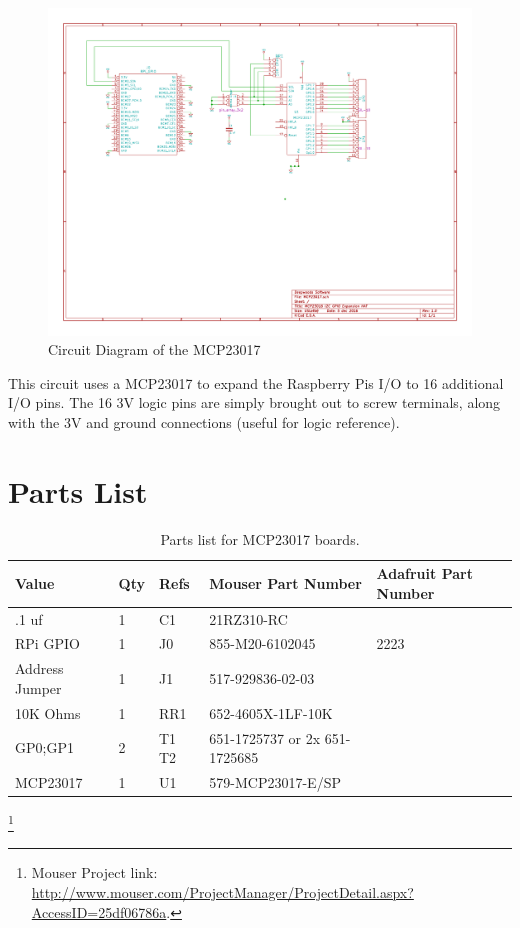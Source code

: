 \begin{figure}[hbpt]\begin{centering}%
\includegraphics[width=5in]{MCP23017.pdf}
\caption{Circuit Diagram of the MCP23017}
\end{centering}\end{figure}
This circuit uses a MCP23017 to expand the Raspberry Pis I/O to 16 additional 
I/O pins. The 16 3V logic pins are simply brought out to screw terminals, 
along with the 3V and ground connections (useful for logic reference).

\section{Parts List}

\begin{table}[htdp]
\begin{centering}\begin{tabular}{|l|l|p{1in}|l|p{.5in}|}
\hline
Value&Qty&Refs&Mouser Part Number&Adafruit Part Number\\
\hline
.1 uf&1&C1&21RZ310-RC&\\
\hline
RPi GPIO&1&J0&855-M20-6102045&2223\\
\hline
Address Jumper&1&J1&517-929836-02-03&\\
\hline
10K Ohms&1&RR1&652-4605X-1LF-10K&\\
\hline
GP0;GP1&2&T1 T2&651-1725737 or 2x 651-1725685&\\
\hline
MCP23017&1&U1&579-MCP23017-E/SP&\\
\hline
\end{tabular}
\caption{Parts list for MCP23017 boards.}
\end{centering}\end{table}\footnote{Mouser Project link: 
\url{http://www.mouser.com/ProjectManager/ProjectDetail.aspx?AccessID=25df06786a}.}

